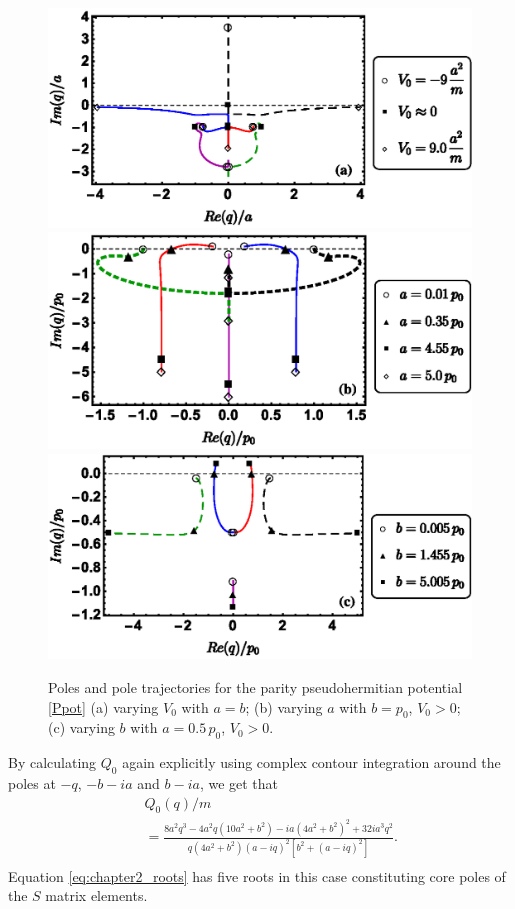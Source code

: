 \begin{figure}[h]
\centering
\includegraphics[width=0.75\linewidth]{Figures/IVSymEigenvalsVaryingV0new.eps}
\includegraphics[width=0.75\linewidth]{Figures/IVSymEigenvalsVaryinganew.eps}
\includegraphics[width=0.75\linewidth]{Figures/IVSymEigenvalsVaryingbnew.eps}
\caption{ Poles and pole trajectories for the parity pseudohermitian potential \eqref{Ppot} (a) varying $V_0$ with $a=b$; (b) varying $a$ with $b=p_0$, $V_0>0$; (c) varying $b$ with $a=0.5\, p_0$, $V_0>0$.}
\label{fig:IVSymEigenvals}
\end{figure}



By calculating $Q_{0}$ again explicitly using complex contour integration around the poles at $-q$, $-b-i a$ and $b-i a$, we get that
%
\begin{eqnarray}
&&Q_{0}(q)/m
\nonumber\\
&&=\frac{8 a^2 q^3-4 a^2 q \left(10 a^2+b^2\right)-i a \left(4 a^2+b^2\right)^2+32 i a^3 q^2}{q \left(4 a^2+b^2\right) (a-i q)^2 \left[b^2+(a-i q)^2\right]}.
\nonumber\\
\end{eqnarray}
%
Equation \eqref{eq:chapter2_roots} has five roots in this case constituting core poles of the $S$ matrix elements.

